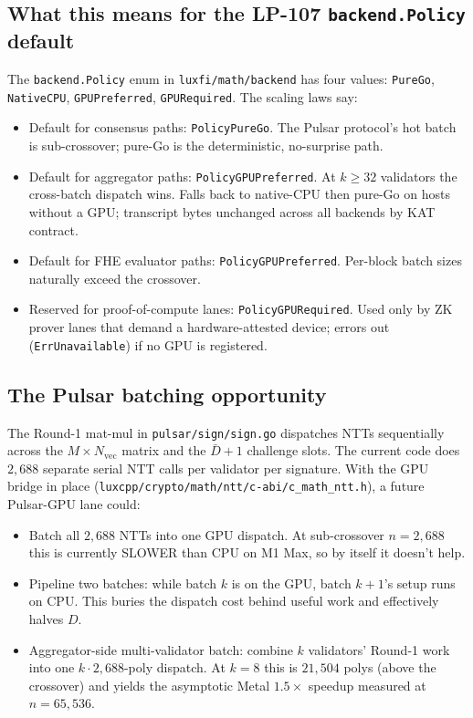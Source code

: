 \subsection{What this means for the LP-107 \texttt{backend.Policy} default}

The \texttt{backend.Policy} enum in \texttt{luxfi/math/backend} has
four values: \texttt{PureGo}, \texttt{NativeCPU},
\texttt{GPUPreferred}, \texttt{GPURequired}. The scaling laws say:

\begin{itemize}[nosep,leftmargin=2em]
\item Default for consensus paths: \texttt{PolicyPureGo}.
The Pulsar protocol's hot batch is sub-crossover; pure-Go is the
deterministic, no-surprise path.
\item Default for aggregator paths: \texttt{PolicyGPUPreferred}.
At $k \geq 32$ validators the cross-batch dispatch wins. Falls back
to native-CPU then pure-Go on hosts without a GPU; transcript bytes
unchanged across all backends by KAT contract.
\item Default for FHE evaluator paths: \texttt{PolicyGPUPreferred}.
Per-block batch sizes naturally exceed the crossover.
\item Reserved for proof-of-compute lanes: \texttt{PolicyGPURequired}.
Used only by ZK prover lanes that demand a hardware-attested device;
errors out (\texttt{ErrUnavailable}) if no GPU is registered.
\end{itemize}

\subsection{The Pulsar batching opportunity}

The Round-1 mat-mul in \texttt{pulsar/sign/sign.go} dispatches NTTs
sequentially across the $M \times N_\text{vec}$ matrix and the
$\bar{D}+1$ challenge slots. The current code does $2{,}688$ separate
serial NTT calls per validator per signature. With the GPU bridge
in place (\texttt{luxcpp/crypto/math/ntt/c-abi/c\_math\_ntt.h}),
a future Pulsar-GPU lane could:

\begin{itemize}[nosep]
\item Batch all $2{,}688$ NTTs into one GPU dispatch.
At sub-crossover $n=2{,}688$ this is currently SLOWER than CPU on
M1 Max, so by itself it doesn't help.
\item Pipeline two batches: while batch $k$ is on the GPU, batch
$k+1$'s setup runs on CPU. This buries the dispatch cost behind
useful work and effectively halves $D$.
\item Aggregator-side multi-validator batch: combine $k$ validators'
Round-1 work into one $k \cdot 2{,}688$-poly dispatch.
At $k = 8$ this is $21{,}504$ polys (above the crossover) and
yields the asymptotic Metal $1.5\times$ speedup measured at
$n = 65{,}536$.
\end{itemize}

